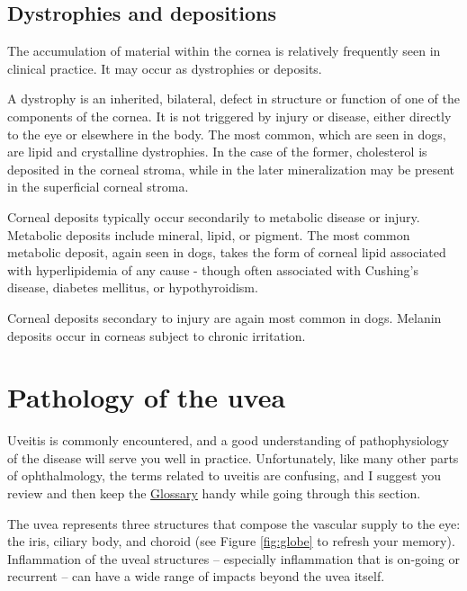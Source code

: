 \documentclass[
  openany]{article}
\begin{document}
\hypertarget{dystrophies-and-depositions}{%
\subsection{Dystrophies and depositions}\label{dystrophies-and-depositions}}

The accumulation of material within the cornea is relatively frequently seen in clinical practice. It may occur as dystrophies or deposits.

A dystrophy is an inherited, bilateral, defect in structure or function of one of the components of the cornea. It is not triggered by injury or disease, either directly to the eye or elsewhere in the body. The most common, which are seen in dogs, are lipid and crystalline dystrophies. In the case of the former, cholesterol is deposited in the corneal stroma, while in the later mineralization may be present in the superficial corneal stroma.

Corneal deposits typically occur secondarily to metabolic disease or injury. Metabolic deposits include mineral, lipid, or pigment. The most common metabolic deposit, again seen in dogs, takes the form of corneal lipid associated with hyperlipidemia of any cause - though often associated with Cushing's disease, diabetes mellitus, or hypothyroidism.

Corneal deposits secondary to injury are again most common in dogs. Melanin deposits occur in corneas subject to chronic irritation.

\hypertarget{pathology-of-the-uvea}{%
\section{Pathology of the uvea}\label{pathology-of-the-uvea}}

Uveitis is commonly encountered, and a good understanding of pathophysiology of the disease will serve you well in practice. Unfortunately, like many other parts of ophthalmology, the terms related to uveitis are confusing, and I suggest you review and then keep the \protect\hyperlink{glossary}{Glossary} handy while going through this section.

The uvea represents three structures that compose the vascular supply to the eye: the iris, ciliary body, and choroid (see Figure \ref{fig:globe} to refresh your memory). Inflammation of the uveal structures -- especially inflammation that is on-going or recurrent -- can have a wide range of impacts beyond the uvea itself.
\end{document}

